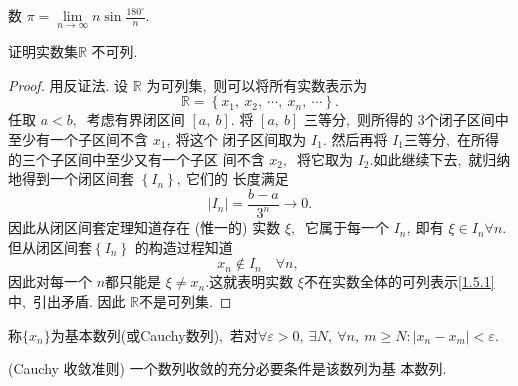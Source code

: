 \begin{definition}
	数 $ \pi=\lim\limits_{n \rightarrow \infty} n \sin \frac{180^{\circ}}{n} .$
\end{definition}
\newpage
\begin{problem}
	证明实数集$  \mathbb{R} $ 不可列.
\end{problem}
\begin{proof}
	用反证法. 设 $ \mathbb{R} $ 为可列集,\  则可以将所有实数表示为
	\begin{equation}
		\mathbb{R}=\left\{x_{1},\  x_{2},\  \cdots,\  x_{n},\  \cdots\right\} .\label{1.5.1}
	\end{equation}
	任取 $ a<b ,\ $ 考虑有界闭区间 $ [a,\  b] .$
	将  $[a,\  b] $ 三等分,\  则所得的 $3 $个闭子区间中至少有一个子区间不含  $x_{1} ,\  $将这个 闭子区间取为 $ I_{1} .$ 然后再将 $ I_{1}  $三等分,\  在所得的三个子区间中至少又有一个子区 间不含  $x_{2} ,\ $ 将它取为 $ I_{2} .$如此继续下去,\  就归纳地得到一个闭区间套 $ \left\{I_{n}\right\} ,\  $它们的 长度满足
	$$\left|I_{n}\right|=\frac{b-a}{3^{n}} \rightarrow 0 .$$
	因此从闭区间套定理知道存在 (惟一的) 实数  $\xi ,\ $ 它属于每一个  $I_{n} ,\  $即有  $\xi \in I_{n} \forall n . $但从闭区间套$  \left\{I_{n}\right\}$  的构造过程知道
	$$x_{n} \notin I_{n}\quad \forall n,\ $$
	因此对每一个 $ n  $都只能是  $\xi \neq x_{n} . $这就表明实数 $ \xi  $不在实数全体的可列表示\eqref{1.5.1} 中,\  引出矛盾. 因此 $ \mathbb{R}  $不是可列集.
\end{proof}
\newpage
\begin{definition}
	称$\{x_n\}$为基本数列(或Cauchy数列),\ 若对$\forall\varepsilon>0,\ \exists N,\ \forall n,\ m\geqslant N:|x_n-x_m|<\varepsilon.$
\end{definition}
\begin{theorem}
	(Cauchy 收敛准则) 一个数列收敛的充分必要条件是该数列为基 本数列.
\end{theorem}
